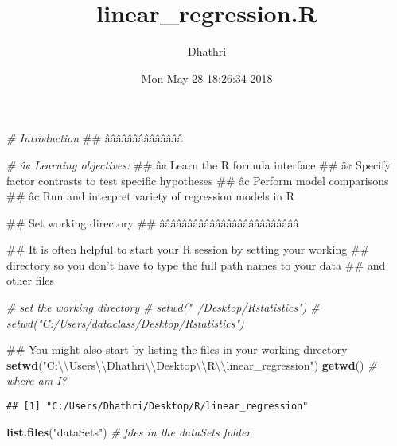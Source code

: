 \documentclass[]{article}
\title{linear\_regression.R}
\author{Dhathri}
\date{Mon May 28 18:26:34 2018}
\newenvironment{Shaded}{\begin{snugshade}}{\end{snugshade}}
\newcommand{\KeywordTok}[1]{\textcolor[rgb]{0.13,0.29,0.53}{\textbf{#1}}}
\newcommand{\CharTok}[1]{\textcolor[rgb]{0.31,0.60,0.02}{#1}}
\newcommand{\StringTok}[1]{\textcolor[rgb]{0.31,0.60,0.02}{#1}}
\newcommand{\CommentTok}[1]{\textcolor[rgb]{0.56,0.35,0.01}{\textit{#1}}}
\newcommand{\NormalTok}[1]{#1}
\begin{document}
\maketitle

\begin{Shaded}
\begin{Highlighting}[]
\CommentTok{#  Introduction}
\NormalTok{## ââââââââââââââ}

\CommentTok{#   â¢ Learning objectives:}
\NormalTok{##     â¢ Learn the R formula interface}
\NormalTok{##     â¢ Specify factor contrasts to test specific hypotheses}
\NormalTok{##     â¢ Perform model comparisons}
\NormalTok{##     â¢ Run and interpret variety of regression models in R}

\NormalTok{## Set working directory}
\NormalTok{## âââââââââââââââââââââââââ}

\NormalTok{##   It is often helpful to start your R session by setting your working}
\NormalTok{##   directory so you don't have to type the full path names to your data}
\NormalTok{##   and other files}

\CommentTok{# set the working directory}
\CommentTok{# setwd("~/Desktop/Rstatistics")}
\CommentTok{# setwd("C:/Users/dataclass/Desktop/Rstatistics")}

\NormalTok{##   You might also start by listing the files in your working directory}
\KeywordTok{setwd}\NormalTok{(}\StringTok{"C:}\CharTok{\textbackslash{}\textbackslash{}}\StringTok{Users}\CharTok{\textbackslash{}\textbackslash{}}\StringTok{Dhathri}\CharTok{\textbackslash{}\textbackslash{}}\StringTok{Desktop}\CharTok{\textbackslash{}\textbackslash{}}\StringTok{R}\CharTok{\textbackslash{}\textbackslash{}}\StringTok{linear_regression"}\NormalTok{)}
\KeywordTok{getwd}\NormalTok{() }\CommentTok{# where am I?}
\end{Highlighting}
\end{Shaded}

\begin{verbatim}
## [1] "C:/Users/Dhathri/Desktop/R/linear_regression"
\end{verbatim}

\begin{Shaded}
\begin{Highlighting}[]
\KeywordTok{list.files}\NormalTok{(}\StringTok{"dataSets"}\NormalTok{) }\CommentTok{# files in the dataSets folder}
\end{Highlighting}
\end{Shaded}
\end{document}
